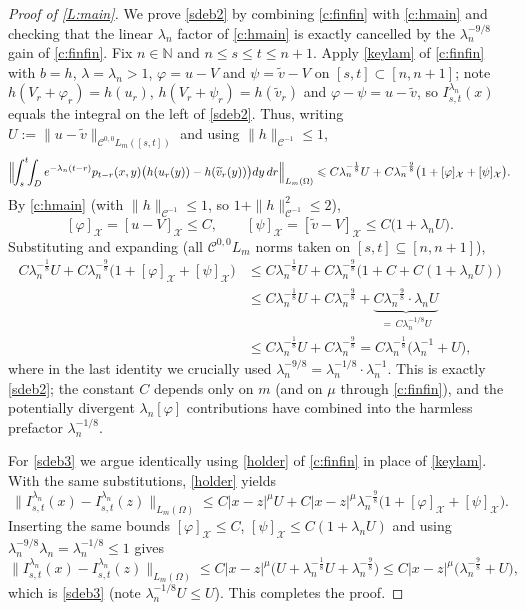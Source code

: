 \documentclass[12pt]{article}
\theoremstyle{definition}
\DeclareMathOperator{\1}{\mathbbm{1}}%
\def\phi{\varphi}
\renewcommand{\le}{\leqslant}
\newcommand{\wt}{\widetilde}
\newcommand{\C}{\mathcal{C}}
\newcommand{\N}{\mathbb{N}}
\newcommand{\X}{\mathcal{X}}
\begin{document}
\begin{proof}[Proof of \cref{L:main}]
We prove \eqref{sdeb2} by combining \cref{c:finfin} with \cref{c:hmain} and
checking that the linear $\lambda_n$ factor of \cref{c:hmain} is exactly
cancelled by the $\lambda_n^{-9/8}$ gain of \cref{c:finfin}. Fix $n\in\N$ and
$n\le s\le t\le n+1$. Apply \eqref{keylam} of \cref{c:finfin} with $b=h$,
$\lambda=\lambda_n>1$, $\phi=u-V$ and $\psi=\wt v-V$ on $[s,t]\subset[n,n+1]$;
note $h(V_r+\phi_r)=h(u_r)$, $h(V_r+\psi_r)=h(\wt v_r)$ and $\phi-\psi=u-\wt v$,
so $I^{\lambda_n}_{s,t}(x)$ equals the integral on the left of \eqref{sdeb2}.
Thus, writing $U:=\|u-\wt v\|_{\C^{0,0}L_m([s,t])}$ and using $\|h\|_{\C^{-1}}\le1$,
\[
\Bigl\|\!\int_s^t\!\!\int_D e^{-\lambda_n(t-r)}p_{t-r}(x,y)\bigl(h(u_r(y))-h(\wt v_r(y))\bigr)dy\,dr\Bigr\|_{L_m(\Omega)}
\le C\lambda_n^{-\frac18}U+C\lambda_n^{-\frac98}\bigl(1+[\phi]_{\X}+[\psi]_{\X}\bigr).
\]
By \cref{c:hmain} (with $\|h\|_{\C^{-1}}\le1$, so $1+\|h\|_{\C^{-1}}^2\le2$),
\[
[\phi]_{\X}=[u-V]_{\X}\le C,\qquad
[\psi]_{\X}=[\wt v-V]_{\X}\le C\bigl(1+\lambda_n U\bigr).
\]
Substituting and expanding (all $\C^{0,0}L_m$ norms taken on $[s,t]\subseteq[n,n+1]$),
\begin{align*}
C\lambda_n^{-\frac18}U+C\lambda_n^{-\frac98}\bigl(1+[\phi]_{\X}+[\psi]_{\X}\bigr)
&\le C\lambda_n^{-\frac18}U+C\lambda_n^{-\frac98}\bigl(1+C+C(1+\lambda_n U)\bigr)\\
&\le C\lambda_n^{-\frac18}U+C\lambda_n^{-\frac98}+\underbrace{C\lambda_n^{-\frac98}\cdot\lambda_n U}_{=\,C\lambda_n^{-1/8}U}\\
&\le C\lambda_n^{-\frac18}U+C\lambda_n^{-\frac98}
= C\lambda_n^{-\frac18}\bigl(\lambda_n^{-1}+U\bigr),
\end{align*}
where in the last identity we crucially used $\lambda_n^{-9/8}=\lambda_n^{-1/8}\cdot\lambda_n^{-1}$.
This is exactly \eqref{sdeb2}; the constant $C$ depends only on $m$ (and on
$\mu$ through \cref{c:finfin}), and the potentially divergent $\lambda_n[\phi]$
contributions have combined into the harmless prefactor $\lambda_n^{-1/8}$.

For \eqref{sdeb3} we argue identically using \eqref{holder} of \cref{c:finfin}
in place of \eqref{keylam}. With the same substitutions, \eqref{holder} yields
\[
\|I^{\lambda_n}_{s,t}(x)-I^{\lambda_n}_{s,t}(z)\|_{L_m(\Omega)}
\le C|x-z|^{\mu}U+C|x-z|^{\mu}\lambda_n^{-\frac98}\bigl(1+[\phi]_{\X}+[\psi]_{\X}\bigr).
\]
Inserting the same bounds $[\phi]_{\X}\le C$, $[\psi]_{\X}\le C(1+\lambda_n U)$ and
using $\lambda_n^{-9/8}\lambda_n=\lambda_n^{-1/8}\le1$ gives
\[
\|I^{\lambda_n}_{s,t}(x)-I^{\lambda_n}_{s,t}(z)\|_{L_m(\Omega)}
\le C|x-z|^{\mu}\bigl(U+\lambda_n^{-\frac18}U+\lambda_n^{-\frac98}\bigr)
\le C|x-z|^{\mu}\bigl(\lambda_n^{-\frac98}+U\bigr),
\]
which is \eqref{sdeb3} (note $\lambda_n^{-1/8}U\le U$). This completes the proof.
\end{proof}
\end{document}
